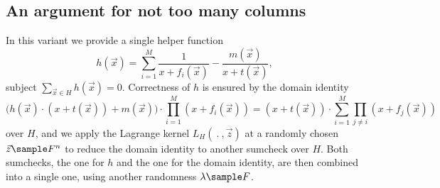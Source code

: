 \documentclass[11pt]{article}
\theoremstyle{definition}
\theoremstyle{remark}
\begin{document}
\subsection{An argument for not too many columns}
\label{s:lookup:small}

In this variant we provide a single helper function
\begin{equation}
\label{e:lookup:h}
h(\vec x) = \sum_{i=1}^M \frac{1}{x + f_i(\vec x)} - \frac{m(\vec x)}{x + t(\vec x)},
\end{equation}
subject $\sum_{\vec x\in H} h(\vec x) = 0$.
Correctness of $h$ is ensured by the domain identity
\begin{equation}
\label{e:lookup:h:identity}
\big(h(\vec x) \cdot  (x + t(\vec x)) + m(\vec x)\big) \cdot \prod_{i=1}^M (x + f_i(\vec x)) = (x + t(\vec x))\cdot \sum_{i=1}^M \prod_{j\neq i} (x + f_j(\vec x))
\end{equation}
over $H$, and we apply the Lagrange kernel $L_H(\:.\:, \vec z)$ at a randomly chosen $\vec z\sample F^n$ to reduce the domain identity to another sumcheck over $H$. 
Both sumchecks, the one for $h$ and the one for the domain identity, are then combined into a single one, using another randomness $\lambda\sample F$.
\end{document}
